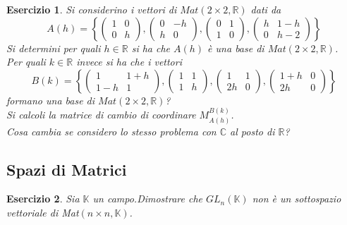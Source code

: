 \documentclass{article}
\newtheorem{es}{Esercizio}
\begin{document}
{\begin{es}
    Si considerino i vettori di $Mat(2\times 2, \mathbb{R})$ dati da
    $$A(h)=\left\{\begin{pmatrix}
            1 & 0\\
            0 & h
        \end{pmatrix}, \begin{pmatrix}
            0 & -h\\
            h & 0
        \end{pmatrix}, \begin{pmatrix}
            0 & 1\\
            1 & 0
        \end{pmatrix}, \begin{pmatrix}
            h & 1-h\\
            0 & h-2
        \end{pmatrix}\right\}$$
    Si determini per quali $h\in \mathbb{R}$ si ha che $A(h)$ è una base di $Mat(2\times 2, \mathbb{R})$.\\
    Per quali $k\in \mathbb{R}$ invece si ha che i vettori
    $$B(k)=\left\{\begin{pmatrix}
            1 & 1+h\\
            1-h & 1
        \end{pmatrix}, \begin{pmatrix}
            1 & 1\\
            1 & h
        \end{pmatrix}, \begin{pmatrix}
            1 & 1\\
            2h & 0
        \end{pmatrix}, \begin{pmatrix}
            1+h & 0\\
            2h & 0
        \end{pmatrix}\right\}$$
    formano una base di $Mat(2\times 2, \mathbb{R})$?\\
    Si calcoli la matrice di cambio di coordinare $M_{A(h)}^{B(k)}$.\\
    Cosa cambia se considero lo stesso problema con $\mathbb{C}$ al posto di $\mathbb{R}$?
\end{es}






\subsection{Spazi di Matrici}
\begin{es}
    Sia $\mathbb{K}$ un campo.Dimostrare che $GL_n(\mathbb{K})$ non è un sottospazio vettoriale di Mat$(n\times n,\mathbb{K})$.
\end{es}

}
\end{document}
